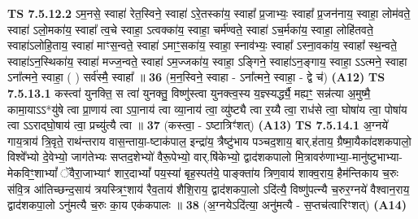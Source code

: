 \documentclass[17pt]{extarticle}
\begin{document}
                  \newline
                                \textbf{ TS 7.5.12.2} \newline
                  ऽम॒नसे॒ स्वाहा॑ रेत॒स्विने॒ स्वाहा॑ ऽरे॒तस्का॑य॒ स्वाहा᳚ प्र॒जाभ्यः॒ स्वाहा᳚ प्र॒जन॑नाय॒ स्वाहा॒ लोम॑वते॒ स्वाहा॑ ऽलो॒मका॑य॒ स्वाहा᳚ त्व॒चे स्वाहा॒ ऽत्वक्का॑य॒ स्वाहा॒ चर्म॑ण्वते॒ स्वाहा॑ ऽच॒र्मका॑य॒ स्वाहा॒ लोहि॑तवते॒ स्वाहा॑ऽलोहि॒ताय॒ स्वाहा॑ माꣳस॒न्वते॒ स्वाहा॑ ऽमाꣳ॒॒सका॑य॒ स्वाहा॒ स्नाव॑भ्यः॒ स्वाहा᳚ ऽस्ना॒वका॑य॒ स्वाहा᳚ स्थ॒न्वते॒ स्वाहा॑ऽन॒स्थिका॑य॒ स्वाहा॑ मज्ज॒न्वते॒ स्वाहा॑ ऽम॒ज्जका॑य॒ स्वाहा॒ ऽङ्गिने॒ स्वाहा॑ऽन॒ङ्गाय॒ स्वाहा॒ ऽऽत्मने॒ स्वाहा ऽना᳚त्मने॒ स्वाहा॒ ( ) सर्व॑स्मै॒ स्वाहा᳚ ॥ \textbf{  36} \newline
                  \newline
                      (म॒न॒स्विने॒ स्वाहा - ऽना᳚त्मने॒ स्वाहा॒ - द्वे च॑)  \textbf{(A12)} \newline \newline
                                        \textbf{ TS 7.5.13.1} \newline
                  कस्त्वा॑ युनक्ति॒ स त्वा॑ युनक्तु॒ विष्णु॑स्त्वा युनक्त्व॒स्य य॒ज्ञ्स्यर्द्ध्यै॒ मह्यꣳ॒॒ सन्न॑त्या अ॒मुष्मै॒ कामा॒याऽऽ*यु॑षे त्वा प्रा॒णाय॑ त्वा ऽपा॒नाय॑ त्वा व्या॒नाय॑ त्वा॒ व्यु॑ष्ट्यै त्वा र॒य्यै त्वा॒ राध॑से त्वा॒ घोषा॑य त्वा॒ पोषा॑य त्वा ऽऽराद्घो॒षाय॑ त्वा॒ प्रच्यु॑त्यै त्वा ॥ \textbf{  37} \newline
                  \newline
                      (कस्त्वा॒ - ऽष्टात्रिꣳ॑शत्)  \textbf{(A13)} \newline \newline
                                        \textbf{ TS 7.5.14.1} \newline
                  अ॒ग्नये॑ गाय॒त्राय॑ त्रि॒वृते॒ राथ॑न्तराय वास॒न्ताया॒-ष्टाक॑पाल॒ इन्द्रा॑य॒ त्रैष्टु॑भाय पञ्चद॒शाय॒ बार्.ह॑ताय॒ ग्रैष्मा॒यैका॑दशकपालो॒ विश्वे᳚भ्यो दे॒वेभ्यो॒ जाग॑तेभ्यः सप्तद॒शेभ्यो॑ वैरू॒पेभ्यो॒ वार्.षि॑केभ्यो॒ द्वाद॑शकपालो मि॒त्रावरु॑णाभ्या॒-मानु॑ष्टुभाभ्या-मेकविꣳ॒॒शाभ्यां᳚ ॅवैरा॒जाभ्याꣳ॑ शार॒दाभ्यां᳚ पय॒स्या॑ बृह॒स्पत॑ये॒ पाङ्क्ता॑य त्रिण॒वाय॑ शाक्व॒राय॒ हैम॑न्तिकाय च॒रुः स॑वि॒त्र आ॑तिच्छन्द॒साय॑ त्रयस्त्रिꣳ॒॒शाय॑ रैव॒ताय॑ शैशि॒राय॒ द्वाद॑शकपा॒लो ऽदि॑त्यै॒ विष्णु॑पत्न्यै च॒रुर॒ग्नये॑ वैश्वान॒राय॒ द्वाद॑शकपा॒लो ऽनु॑मत्यै च॒रुः का॒य एक॑कपालः ॥ \textbf{  38} \newline
                  \newline
                      (अ॒ग्नयेऽदि॑त्या॒ अनु॑मत्यै - स॒प्तच॑त्वारिꣳशत्)  \textbf{(A14)} \newline \newline
\end{document}
